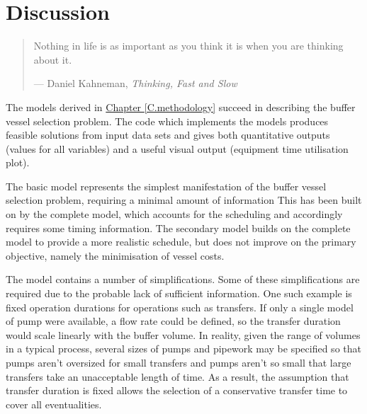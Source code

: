 %
%
%
%

\chapter{Discussion}\label{C.discussion}

\begin{quote}
Nothing in life is as important as you think it is when you are thinking about
it.

\hspace{2cm}--- Daniel Kahneman,
\emph{Thinking, Fast and Slow}
\end{quote}

The models derived in \hyperref[C.methodology]{Chapter \ref*{C.methodology}}
succeed in describing the buffer vessel selection problem.
The code which implements the models produces feasible
solutions from input data sets and gives both quantitative outputs (values for
all variables) and a useful visual output (equipment time utilisation plot).

The basic model represents the simplest manifestation of the buffer vessel
selection problem, requiring a minimal amount of information
This has been built on by the complete model, which accounts for the scheduling
and accordingly requires some timing information.
The secondary model builds on the complete model to provide a more realistic
schedule, but does not improve on the primary objective, namely the
minimisation of vessel costs.

The model contains a number of simplifications.
Some of these simplifications are required due to the probable lack of
sufficient information.
One such example is fixed operation durations for operations such as
transfers.
If only a single model of pump were available, a flow rate could be
defined, so the transfer duration would scale linearly with the buffer volume.
In reality, given the range of volumes in a typical process, several sizes of
pumps and pipework may be specified so that pumps aren't oversized for small
transfers and pumps aren't so small that large transfers take an unacceptable
length of time.  As a result, the assumption that transfer duration is fixed
allows the selection of a conservative transfer time to cover all
eventualities.

